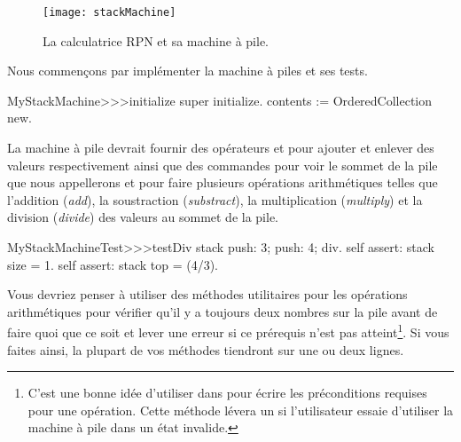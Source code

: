 \documentclass[a4paper,10pt,twoside]{book}
\begin{document}
\begin{figure}[ht]
\begin{center}
\texttt{[image: stackMachine]}
\caption{La calculatrice RPN et sa machine à pile.}
\end{center}
\end{figure}

Nous commençons par implémenter la machine à piles et ses tests.


\begin{code}{}
MyStackMachine>>>initialize
	super initialize.
	contents := OrderedCollection new.
\end{code}

La machine à pile devrait fournir des opérateurs  et
pour ajouter et enlever des valeurs respectivement ainsi que des
commandes pour voir le sommet de la pile que nous appellerons  
et pour faire plusieurs opérations arithmétiques telles que l'addition (\emph{add}),
la soustraction (\emph{substract}), la multiplication (\emph{multiply}) 
et la division (\emph{divide}) des valeurs au sommet de la pile.


\begin{code}{}
MyStackMachineTest>>>testDiv
	stack
		push: 3;
		push: 4;
		div.
	self assert: stack size = 1.
	self assert: stack top = (4/3).
\end{code}

Vous devriez penser à utiliser des méthodes utilitaires pour les
opérations arithmétiques pour vérifier qu'il y a toujours deux nombres
sur la pile avant de faire quoi que ce soit et lever une erreur si
ce prérequis n'est pas atteint\footnote{C'est une bonne idée d'utiliser  
dans 
pour écrire les préconditions requises pour une opération. Cette méthode lévera un 
 si l'utilisateur essaie d'utiliser la machine à pile dans un état invalide.}.
Si vous faites ainsi, la plupart de vos méthodes tiendront sur une ou deux lignes.
\end{document}
